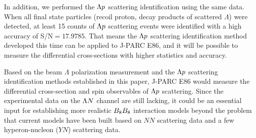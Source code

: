 In addition, we performed the $\Lambda p$ scattering identification using the same data. When all final state particles (recoil proton, decay products of scattered $\Lambda$) were detected, at least 15 counts of $\Lambda p$ scattering events were identified with a high accuracy of S/N$=17.9785$. That means the $\Lambda p$ scattering identification method developed this time can be applied to J-PARC E86, and it will be possible to measure the differential cross-sections with higher statistics and accuracy.

Based on the beam $\Lambda$ polarization measurement and the $\Lambda p$ scattering identification methods established in this paper, J-PARC E86 would measure the differential cross-section and spin observables of $\Lambda p$ scattering. Since the experimental data on the $\Lambda N$ channel are still lacking, it could be an essential input for establishing more realistic $B_{8}B_{8}$ interaction models beyond the problem that current models have been built based on $NN$ scattering data and a few hyperon-nucleon ($YN$) scattering data. 


%
